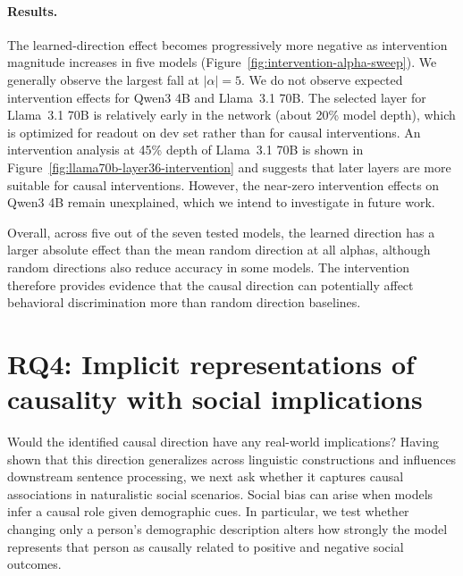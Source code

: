 \documentclass[11pt]{article}
\begin{document}
\paragraph{Results.}
The learned-direction effect becomes progressively more negative as intervention magnitude increases in five models (Figure~\ref{fig:intervention-alpha-sweep}). We generally observe the largest fall at $|\alpha|=5$. We do not observe expected intervention effects for Qwen3 4B and Llama~3.1 70B. The selected layer for Llama~3.1 70B is relatively early in the network (about 20\% model depth), which is optimized for readout on dev set rather than for causal interventions. An intervention analysis at 45\% depth of Llama~3.1 70B is shown in Figure~\ref{fig:llama70b-layer36-intervention} and suggests that later layers are more suitable for causal interventions. However, the near-zero intervention effects on Qwen3 4B remain unexplained, which we intend to investigate in future work. 

Overall, across five out of the seven tested models, the learned direction has a larger absolute effect than the mean random direction at all alphas, although random directions also reduce accuracy in some models. The intervention therefore provides evidence that the causal direction can potentially affect behavioral discrimination more than random direction baselines.

\section{RQ4: Implicit representations of causality with social implications}
\label{sec:naturalistic}
Would the identified causal direction have any real-world implications? Having shown that this direction generalizes across linguistic constructions and influences downstream sentence processing, we next ask whether it captures causal associations in naturalistic social scenarios. Social bias can arise when models infer a causal role given demographic cues. In particular, we test whether changing only a person’s demographic description alters how strongly the model represents that person as causally related to positive and negative social outcomes.
\end{document}
